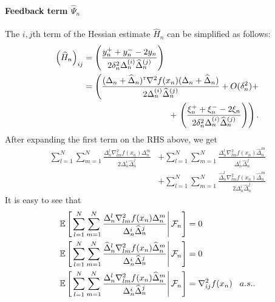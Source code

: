 \documentclass[twocolumn]{IEEEtran}
\begin{document}
\paragraph{\textbf{Feedback term }$\widehat \Psi_n$}
The $i,j$th term of the Hessian estimate $\widehat H_n$ can be simplified as follows: 
\begin{align}
\left(\widehat H_n \right)_{ij} & =  \left(\dfrac{y_n^+ + y_n^- - 2 y_n}{2\delta_n^2 \Delta_n^{(i)} \widehat \Delta_n^{(j)}}\right) \nonumber \\
& = \left( \frac{(\Delta_n+ \widehat \Delta_n)\tr \nabla^2 f(x_n) (\Delta_n+ \widehat \Delta_n)}{2\Delta_n^{(i)} \widehat \Delta_n^{(j)}} +  O(\delta_n^2) + \right.\nonumber \\&\hspace{10em}+\left.\left(\dfrac{\xi_n^+ + \xi_n^- - 2 \xi_n}{2\delta_n^2 \Delta_n^{(i)} \widehat \Delta_n^{(j)}} \right)\right).\label{eq:h3}
\end{align}
After expanding the first term on the RHS above, we get
\begin{align}
\sum\limits_{l=1}^N\sum\limits_{m=1}^N \frac{\Delta_n^l \nabla^2_{lm} f(x_n) \Delta_n^m}{2\Delta_n^i \widehat\Delta_n^j} &+  \sum\limits_{l=1}^N\sum\limits_{m=1}^N \frac{\Delta_n^l \nabla^2_{lm} f(x_n) \widehat\Delta_n^m}{\Delta_n^i \widehat\Delta_n^j} \nonumber \\ & + \sum\limits_{l=1}^N\sum\limits_{m=1}^N \frac{\widehat\Delta_n^l \nabla^2_{lm} f(x_n)\widehat \Delta_n^m}{2\Delta_n^i \widehat\Delta_n^j}\label{eq:2spsaexp}
\end{align}
It is easy to see that 
\begin{align}
&\mathbb{E}\left[\left.\sum\limits_{l=1}^N\sum\limits_{m=1}^N \frac{\Delta_n^l \nabla^2_{lm} f(x_n) \Delta_n^m}{\Delta_n^i \widehat\Delta_n^j} \right | \mathcal{F}_n\right] = 0 \nonumber\\ &\mathbb{E}\left[\left.\sum\limits_{l=1}^N\sum\limits_{m=1}^N \frac{\widehat\Delta_n^l \nabla^2_{lm} f(x_n) \widehat\Delta_n^m}{\Delta_n^i \widehat\Delta_n^j }\right | \mathcal{F}_n\right] = 0 \nonumber\\ &\mathbb{E}\left[\left. \sum\limits_{l=1}^N\sum\limits_{m=1}^N \frac{\Delta_n^l \nabla^2_{lm} f(x_n) \widehat\Delta_n^m}{\Delta_n^i \widehat\Delta_n^j} \right | \mathcal{F}_n\right] = \nabla^2_{ij} f(x_n) \hspace{0.3cm}a.s..
\end{align}
\end{document}
